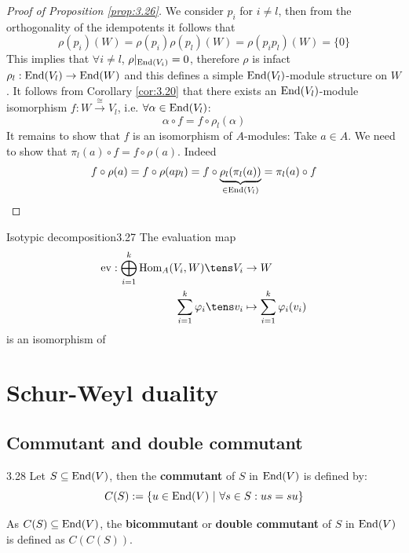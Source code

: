 \documentclass[twoside = false,	%
		headsepline,		%
		parskip = true,
		]{scrbook}						%
\begin{document}
\begin{proof}[Proof of Proposition \ref{prop:3.26}]
            We consider $p_i$ for $i \neq l$, then from the orthogonality of the idempotents it follows that
            \begin{equation*}
                \rho(p_i)(W) = \rho(p_i)\rho(p_l)(W) = \rho(p_ip_l)(W) = \{0\}
            \end{equation*}
            This implies that $\forall i \neq l$, $\rho|_{\mathrm{End}(V_i)} = 0$, therefore $\rho$ is infact $\rho_l:\mathrm{End}(V_l) \to \mathrm{End}(W)$ and this defines a simple $\mathrm{End}(V_l)$-module structure on $W$. It follows from Corollary \ref{cor:3.20} that there exists an $\mathrm{End}(V_l)$-module isomorphism $f: W \xrightarrow{\cong} V_l$, i.e. $\forall \alpha \in \mathrm{End}(V_l)$:
            \begin{equation*}
                \alpha \circ f = f \circ \rho_l(\alpha)
            \end{equation*}
            It remains to show that $f$ is an isomorphism of $A$-modules: Take $a \in A$. We need to show that $\pi_l(a) \circ f = f \circ \rho(a)$. Indeed
            \begin{equation*}
                f \circ \rho(a) = f \circ \rho(a p_l) = f \circ \underbrace{\rho_l(\pi_l(a))}_{\in \mathrm{End}(V_l)} = \pi_l(a) \circ f
            \end{equation*}
        \end{proof}


        \begin{proposition}{Isotypic decomposition}{3.27}
            The evaluation map
            \begin{equation*}
            \begin{split}
                \ev: \bigoplus_{i=1}^k \Hom_A(V_i,W) \tens V_i &\to W \\
                    \sum_{i=1}^k \varphi_i \tens v_i &\mapsto \sum_{i=1}^k \varphi_i(v_i)
            \end{split}
            \end{equation*}
            is an isomorphism of 
        \end{proposition}

\section{Schur-Weyl duality}
    \subsection{Commutant and double commutant}
        \begin{definition}{}{3.28}
            Let $S \subseteq \mathrm{End}(V)$, then the \textbf{commutant} of $S$ in $\mathrm{End}(V)$ is defined by:
            \begin{equation*}
                C(S):= \{u \in \mathrm{End}(V) \ | \ \forall s \in S: us = su \}
            \end{equation*}
        \end{definition}
        As $C(S) \subseteq \mathrm{End}(V)$, the \textbf{bicommutant} or \textbf{double commutant} of $S$ in $\mathrm{End}(V)$ is defined as $C(C(S))$.
\end{document}
